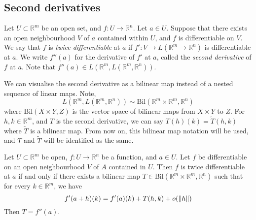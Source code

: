 \subsection{Second derivatives}
\begin{definition}
	Let \( U \subset \mathbb R^m \) be an open set, and \( f \colon U \to \mathbb R^n \).
	Let \( a \in U \).
	Suppose that there exists an open neighbourhood \( V \) of \( a \) contained within \( U \), and \( f \) is differentiable on \( V \).
	We say that \( f \) is \textit{twice differentiable} at \( a \) if \( f' \colon V \to L(\mathbb R^m \to \mathbb R^n) \) is differentiable at \( a \).
	We write \( f''(a) \) for the derivative of \( f' \) at \( a \), called the \textit{second derivative} of \( f \) at \( a \).
	Note that \( f''(a) \in L(\mathbb R^m, L(\mathbb R^m, \mathbb R^n)) \).
\end{definition}
\begin{remark}
	We can visualise the second derivative as a bilinear map instead of a nested sequence of linear maps.
	Note,
	\[
		L(\mathbb R^m, L(\mathbb R^m, \mathbb R^n)) \sim \mathrm{Bil}(\mathbb R^m \times \mathbb R^m, \mathbb R^n)
	\]
	where \( \mathrm{Bil}(X \times Y, Z) \) is the vector space of bilinear maps from \( X \times Y \) to \( Z \).
	For \( h, k \in \mathbb R^m \), and \( T \) is the second derivative, we can say \( T(h)(k) = \widetilde T(h,k) \) where \( \widetilde T \) is a bilinear map.
	From now on, this bilinear map notation will be used, and \( T \) and \( \widetilde T \) will be identified as the same.
\end{remark}
\begin{proposition}
	Let \( U \subset \mathbb R^m \) be open, \( f \colon U \to \mathbb R^n \) be a function, and \( a \in U \).
	Let \( f \) be differentiable on an open neighbourhood \( V \) of \( A \) contained in \( U \).
	Then \( f \) is twice differentiable at \( a \) if and only if there exists a bilinear map \( T \in \mathrm{Bil}(\mathbb R^m \times \mathbb R^m, \mathbb R^n) \) such that for every \( k \in \mathbb R^m \), we have
	\[
		f'(a+h)(k) = f'(a)(k) + T(h,k) + o(\norm{h})
	\]
	Then \( T = f''(a) \).
\end{proposition}
